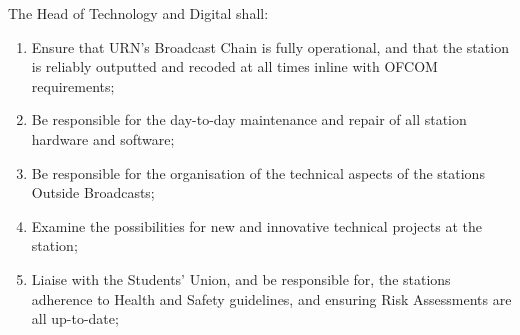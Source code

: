 \item The Head of Technology and Digital shall:
\begin{enumerate}[label*=\arabic*.]
    \item Ensure that URN's Broadcast Chain is fully operational, and that the station is reliably outputted and recoded at all times inline with OFCOM requirements;
    \item Be responsible for the day-to-day maintenance and repair of all station hardware and software;
    \item Be responsible for the organisation of the technical aspects of the stations Outside Broadcasts;
    \item Examine the possibilities for new and innovative technical projects at the station;
    \item Liaise with the Students’ Union, and be responsible for, the stations adherence to Health and Safety guidelines, and ensuring Risk Assessments are all up-to-date;
\end{enumerate}

